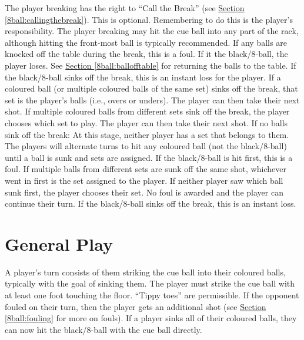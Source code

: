  \CueBallPlacement%
 The player breaking has the right to “Call the Break” (see \hyperref[8ball:callingthebreak]{Section \ref*{8ball:callingthebreak}}). This is optional. Remembering to do this is the player's responsibility.%
 \label{8ball:breakingballs}The player breaking may hit the cue ball into any part of the rack, although hitting the front-most ball is typically recommended.%
 \CueBallMissOffBreak[8ball]%
 \CueBallRailOffBreak%
 \CueBallSinkOffBreak%
 If any balls are knocked off the table during the break, this is a foul. If it the black/8-ball, the player loses. See \hyperref[8ball:ballofftable]{Section \ref*{8ball:ballofftable}} for returning the balls to the table.%
 If the black/8-ball sinks off the break, this is an instant loss for the player.%
 If a coloured ball (or multiple coloured balls of the same set) sinks off the break, that set is the player's balls (i.e., overs or unders). The player can then take their next shot.%
 If multiple coloured balls from different sets sink off the break, the player chooses which set to play. The player can then take their next shot.%
\label{8ball:breakingnoballs}If no balls sink off the break:%
\subruleitem At this stage, neither player has a set that belongs to them. The players will alternate turns to hit any coloured ball (not the black/8-ball) until a ball is sunk and sets are assigned.%
\subruleitem If the black/8-ball is hit first, this is a foul.%
\subruleitem If multiple balls from different sets are sunk off the same shot, whichever went in first is the set assigned to the player. If neither player saw which ball sunk first, the player chooses their set. No foul is awarded and the player can continue their turn.%
 If the black/8-ball sinks off the break, this is an instant loss.%

\section{General Play} \label{8ball:general}

 A player's turn consists of them striking the cue ball into their coloured balls, typically with the goal of sinking them.%
 The player must strike the cue ball with at least one foot touching the floor. “Tippy toes” are permissible.%
 If the opponent fouled on their turn, then the player gets an additional shot (see \hyperref[8ball:fouling]{Section \ref*{8ball:fouling}} for more on fouls).%
 If a player sinks all of their coloured balls, they can now hit the black/8-ball with the cue ball directly.%
 \AlternateTurns[8ball]%

